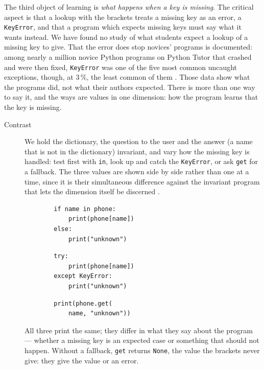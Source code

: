 The third object of learning is \emph{what happens when a key is missing}. The
critical aspect is that a lookup with the brackets treats a missing key as an
error, a \texttt{KeyError}, and that a program which expects
missing keys must say what it wants instead.
We have found no study of what students expect a lookup of a missing key to
give. That the error does stop novices' programs is documented: among nearly a
million novice Python programs on Python Tutor that crashed and were then
fixed, \texttt{KeyError} was one of the five most common uncaught
exceptions, though, at 3\,\%, the least common of them
\autocite{Cosman2020PABLO}. Those data show what the programs did, not what
their authors expected.
There is more than one way to say it, and the ways are values in one
dimension: how the program learns that the key is missing.

\begin{description}
  \item[Contrast] We hold the dictionary, the question to the user and the
    answer (a name that is not in the dictionary) invariant, and vary how the
    missing key is handled: test first with \texttt{in}, look up
    and catch the \texttt{KeyError}, or ask
    \texttt{get} for a fallback. The three values are shown
    side by side rather than one at a time, since it is their simultaneous
    difference against the invariant program that lets the dimension itself
    be discerned \autocite[pp.~45--47]{NCOL}.

    \hfill
    \begin{minipage}[t]{0.3\columnwidth}
      \begin{verbatim}
        if name in phone:
            print(phone[name])
        else:
            print("unknown")
      \end{verbatim}
    \end{minipage}
    \hfill
    \begin{minipage}[t]{0.3\columnwidth}
      \begin{verbatim}
        try:
            print(phone[name])
        except KeyError:
            print("unknown")
      \end{verbatim}
    \end{minipage}
    \hfill
    \begin{minipage}[t]{0.3\columnwidth}
      \begin{verbatim}
        print(phone.get(
            name, "unknown"))
      \end{verbatim}
    \end{minipage}
    \newline
    All three print the same; they differ in what they say about the program
    --- whether a missing key is an expected case or something that should not
    happen. Without a fallback, \texttt{get} returns
    \texttt{None}, the value the brackets never give: they give
    the value or an error.
\end{description}

